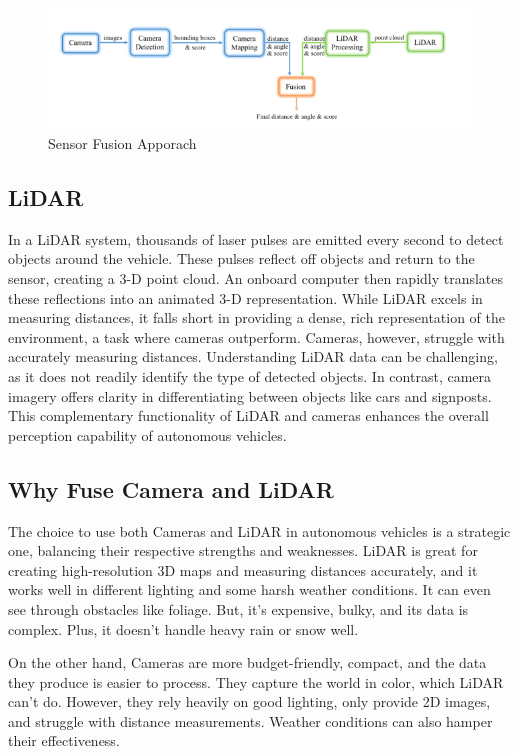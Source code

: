 \documentclass[letterpaper, 10 pt, conference]{ieeeconf}  %
\begin{document}
\begin{figure}[htbp]
  \centering
  \includegraphics[width=\linewidth]{fusion.png}
  \caption{Sensor Fusion Apporach}
  \label{Sensor Fusion}
\end{figure}	

\subsection{LiDAR}   
In a LiDAR system, thousands of laser pulses are emitted every second to detect objects around the vehicle. These pulses reflect off objects and return to the sensor, creating a 3-D point cloud. An onboard computer then rapidly translates these reflections into an animated 3-D representation. While LiDAR excels in measuring distances, it falls short in providing a dense, rich representation of the environment, a task where cameras outperform. Cameras, however, struggle with accurately measuring distances. Understanding LiDAR data can be challenging, as it does not readily identify the type of detected objects. In contrast, camera imagery offers clarity in differentiating between objects like cars and signposts. This complementary functionality of LiDAR and cameras enhances the overall perception capability of autonomous vehicles.

\subsection{Why Fuse Camera and LiDAR}   
The choice to use both Cameras and LiDAR in autonomous vehicles is a strategic one, balancing their respective strengths and weaknesses. LiDAR is great for creating high-resolution 3D maps and measuring distances accurately, and it works well in different lighting and some harsh weather conditions. It can even see through obstacles like foliage. But, it's expensive, bulky, and its data is complex. Plus, it doesn't handle heavy rain or snow well.

On the other hand, Cameras are more budget-friendly, compact, and the data they produce is easier to process. They capture the world in color, which LiDAR can't do. However, they rely heavily on good lighting, only provide 2D images, and struggle with distance measurements. Weather conditions can also hamper their effectiveness.
\end{document}
